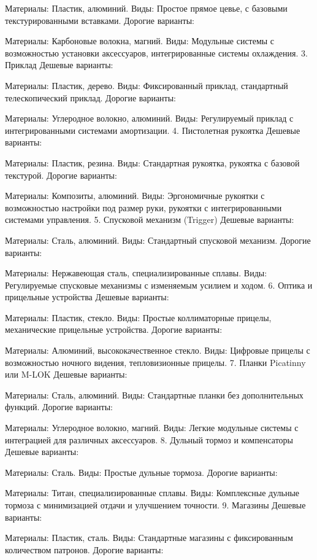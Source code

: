 \documentclass[a4paper,12pt]{article}
\begin{document}
Материалы: Пластик, алюминий.
Виды: Простое прямое цевье, с базовыми текстурированными вставками.
Дорогие варианты:

Материалы: Карбоновые волокна, магний.
Виды: Модульные системы с возможностью установки аксессуаров, интегрированные системы охлаждения.
3. Приклад
Дешевые варианты:

Материалы: Пластик, дерево.
Виды: Фиксированный приклад, стандартный телескопический приклад.
Дорогие варианты:

Материалы: Углеродное волокно, алюминий.
Виды: Регулируемый приклад с интегрированными системами амортизации.
4. Пистолетная рукоятка
Дешевые варианты:

Материалы: Пластик, резина.
Виды: Стандартная рукоятка, рукоятка с базовой текстурой.
Дорогие варианты:

Материалы: Композиты, алюминий.
Виды: Эргономичные рукоятки с возможностью настройки под размер руки, рукоятки с интегрированными системами управления.
5. Спусковой механизм (Trigger)
Дешевые варианты:

Материалы: Сталь, алюминий.
Виды: Стандартный спусковой механизм.
Дорогие варианты:

Материалы: Нержавеющая сталь, специализированные сплавы.
Виды: Регулируемые спусковые механизмы с изменяемым усилием и ходом.
6. Оптика и прицельные устройства
Дешевые варианты:

Материалы: Пластик, стекло.
Виды: Простые коллиматорные прицелы, механические прицельные устройства.
Дорогие варианты:

Материалы: Алюминий, высококачественное стекло.
Виды: Цифровые прицелы с возможностью ночного видения, тепловизионные прицелы.
7. Планки Picatinny или M-LOK
Дешевые варианты:

Материалы: Сталь, алюминий.
Виды: Стандартные планки без дополнительных функций.
Дорогие варианты:

Материалы: Углеродное волокно, магний.
Виды: Легкие модульные системы с интеграцией для различных аксессуаров.
8. Дульный тормоз и компенсаторы
Дешевые варианты:

Материалы: Сталь.
Виды: Простые дульные тормоза.
Дорогие варианты:

Материалы: Титан, специализированные сплавы.
Виды: Комплексные дульные тормоза с минимизацией отдачи и улучшением точности.
9. Магазины
Дешевые варианты:

Материалы: Пластик, сталь.
Виды: Стандартные магазины с фиксированным количеством патронов.
Дорогие варианты:
\end{document}
